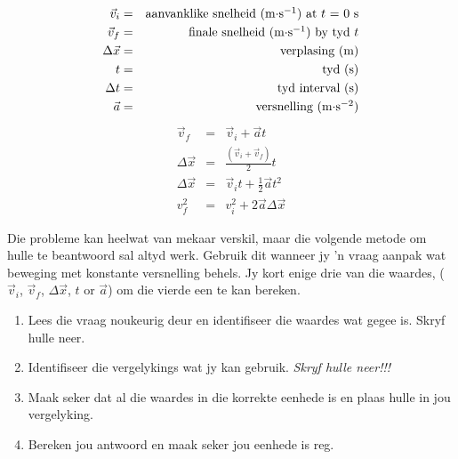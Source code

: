\label{m38796*id75611}\nopagebreak\noindent{}
\begin{eqnarray*}
\vec{v}_i &=& \mbox{aanvanklike snelheid (m$\cdot$s$^{-1}$) at $t$ = 0 s} \\
\vec{v}_f &=& \mbox{finale snelheid (m$\cdot$s$^{-1}$) by tyd $t$}\\
\Delta \vec{x} &=& \mbox{verplasing (m)} \\
t &=& \mbox{tyd (s)} \\
\Delta t &=& \mbox{tyd interval (s)} \\
\vec{a} &=& \mbox{versnelling (m$\cdot$s$^{-2}$)}
\end{eqnarray*}
      \label{m38796*eip-506}\nopagebreak\noindent{}
\begin{eqnarray}
\vec{v}_f &=& \vec{v}_i + \vec{a}t \label{eq:eq1}\\
\Delta \vec{x} &=& \frac{(\vec{v}_i + \vec{v}_f)}{2} t\label{eq:eq2}\\
\Delta \vec{x} &=& \vec{v}_it + \frac{1}{2}\vec{a}t^2 \label{eq:eq3}\\
v_f^2 &=& v_i^2 + 2\vec{a} \Delta \vec{x} \label{eq:eq4}
\end{eqnarray}

Die probleme kan heelwat van mekaar verskil, maar die volgende metode om hulle te beantwoord sal altyd werk. Gebruik dit wanneer jy 'n vraag aanpak wat beweging met konstante versnelling behels. Jy kort enige drie van die waardes, ($\vec{v}_{i}$, $\vec{v}_{f}$, $\Delta \vec{x}$, $t$ or $\vec{a}$) om die vierde een te kan bereken.\par

\begin{enumerate}[noitemsep, label=\textbf{\arabic*}. ] 
    \item Lees die vraag noukeurig deur en identifiseer die waardes wat gegee is. Skryf hulle neer.
    \item Identifiseer die vergelykings wat jy kan gebruik. \textsl{Skryf hulle neer!!!}
    \item Maak seker dat al die waardes in die korrekte eenhede is en plaas hulle in jou vergelyking.
    \item Bereken jou antwoord en maak seker jou eenhede is reg.
\end{enumerate}

	\par
      \label{m38796*uid134}
            
